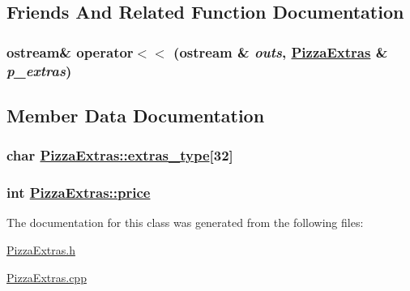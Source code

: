 \subsection{Friends And Related Function Documentation}
\hypertarget{class_pizza_extras_01be6c7f4cc0dae56b875e6179844126}{
\subsubsection[operator$<$$<$]{\setlength{\rightskip}{0pt plus 5cm}ostream\& operator$<$$<$ (ostream \& {\em outs}, \hyperlink{class_pizza_extras}{Pizza\-Extras} \& {\em p\_\-extras})}}
\label{class_pizza_extras_01be6c7f4cc0dae56b875e6179844126}




\subsection{Member Data Documentation}
\hypertarget{class_pizza_extras_22c51029f6700dc22d22c0f972ff904e}{
\subsubsection[extras\_\-type]{\setlength{\rightskip}{0pt plus 5cm}char \hyperlink{class_pizza_extras_22c51029f6700dc22d22c0f972ff904e}{Pizza\-Extras::extras\_\-type}\mbox{[}32\mbox{]}}}
\label{class_pizza_extras_22c51029f6700dc22d22c0f972ff904e}


\hypertarget{class_pizza_extras_78a5eb43deef9a7b5b9ce157b9d52ac4}{
\subsubsection[price]{\setlength{\rightskip}{0pt plus 5cm}int \hyperlink{class_pizza_extras_78a5eb43deef9a7b5b9ce157b9d52ac4}{Pizza\-Extras::price}}}
\label{class_pizza_extras_78a5eb43deef9a7b5b9ce157b9d52ac4}




The documentation for this class was generated from the following files:\begin{CompactItemize}
\item 
\hyperlink{_pizza_extras_8h}{Pizza\-Extras.h}\item 
\hyperlink{_pizza_extras_8cpp}{Pizza\-Extras.cpp}\end{CompactItemize}
